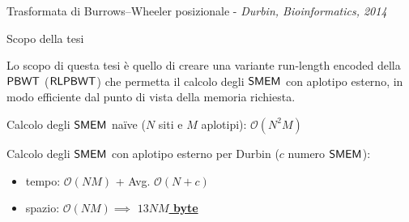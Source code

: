 \documentclass[]{beamer}
\def\PBWT{\mbox{\rm {\sf PBWT}}}
\def\RLPBWT{\mbox{\rm {\sf RLPBWT}}}
\def\SMEM{\mbox{\rm {\sf SMEM}}}
\begin{document}
\begin{frame}{{\small{Trasformata di Burrows--Wheeler posizionale -}} {\scriptsize{\textit{Durbin, Bioinformatics,
               2014}}}}
{\begin{figure}[H]
    \end{figure}
  }
\end{frame}
\begin{frame}{Scopo della tesi}
   \begin{alertblock}{}
    Lo scopo di questa tesi è quello di creare
    una variante run-length encoded della $\PBWT$ ($\RLPBWT$) che permetta
    il calcolo degli $\SMEM$ con
    aplotipo esterno, in modo efficiente dal 
    punto di vista della memoria richiesta. 
  \end{alertblock}
  \begin{block}{}
    Calcolo degli $\SMEM$ na\"{i}ve ($N$ siti e $M$
    aplotipi):
    $\mathcal{O}(N^2M)$
  \end{block}
  \begin{block}{}
    Calcolo degli $\SMEM$ con aplotipo esterno per Durbin ($c$ numero $\SMEM$):
    \begin{itemize}
      \item tempo: $\mathcal{O}(\mathit{NM})$ + Avg. $\mathcal{O}(N+c)$
      \item spazio: $\mathcal{O}(\mathit{NM})\implies$
      \underline{\textbf{$13\mathit{NM}$ byte}}
    \end{itemize}
  \end{block}
 
\end{frame}
\end{document}
